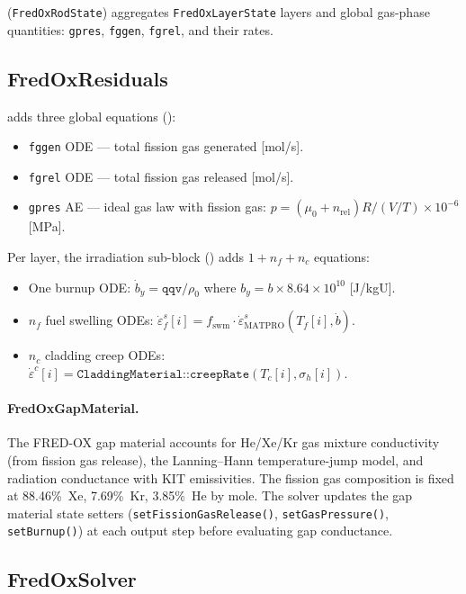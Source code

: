 \documentclass[11pt,a4paper]{article}
\begin{document}
 (\texttt{FredOxRodState}) aggregates \texttt{FredOxLayerState} layers and global gas-phase quantities: \texttt{gpres}, \texttt{fggen}, \texttt{fgrel}, and their rates.

\subsection{FredOxResiduals}
\label{sec:ox_res}

 adds three global equations ():
\begin{itemize}
  \item \texttt{fggen} ODE — total fission gas generated [mol/s].
  \item \texttt{fgrel} ODE — total fission gas released [mol/s].
  \item \texttt{gpres} AE — ideal gas law with fission gas: $p = (\mu_0 + n_\text{rel}) R / (V/T) \times 10^{-6}$ [MPa].
\end{itemize}

Per layer, the irradiation sub-block () adds $1 + n_f + n_c$ equations:
\begin{itemize}
  \item One burnup ODE: $\dot{b}_y = \texttt{qqv} / \rho_0$ where $b_y = b \times 8.64 \times 10^{10}$ [J/kgU].
  \item $n_f$ fuel swelling ODEs: $\dot{\varepsilon}^s_f[i] = f_\text{swm} \cdot \dot{\varepsilon}^s_\text{MATPRO}(T_f[i], \dot{b})$.
  \item $n_c$ cladding creep ODEs: $\dot{\varepsilon}^c[i] = \texttt{CladdingMaterial::creepRate}(T_c[i], \sigma_h[i])$.
\end{itemize}

\paragraph{FredOxGapMaterial.}
The FRED-OX gap material accounts for He/Xe/Kr gas mixture conductivity (from fission gas release), the Lanning--Hann temperature-jump model, and radiation conductance with KIT emissivities.  The fission gas composition is fixed at 88.46\%~Xe, 7.69\%~Kr, 3.85\%~He by mole.  The solver updates the gap material state setters (\texttt{setFissionGasRelease()}, \texttt{setGasPressure()}, \texttt{setBurnup()}) at each output step before evaluating gap conductance.

\subsection{FredOxSolver}
\label{sec:ox_solver}
\end{document}
